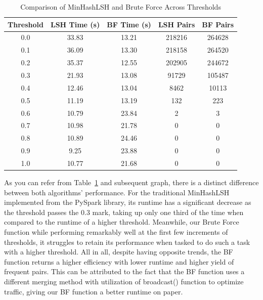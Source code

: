 \begin{table}[h]
    \centering
    \caption{Comparison of MinHashLSH and Brute Force Across Thresholds}
    \begin{tabular}{|c|c|c|c|c|}
        \hline
        \textbf{Threshold} & \textbf{LSH Time (s)} & \textbf{BF Time (s)} & \textbf{LSH Pairs} & \textbf{BF Pairs} \\
        \hline
        0.0 & 33.83 & 13.21 & 218216 & 264628 \\
        0.1 & 36.09 & 13.30 & 218158 & 264520 \\
        0.2 & 35.37 & 12.55 & 202905 & 244672 \\
        0.3 & 21.93 & 13.08 & 91729  & 105487 \\
        0.4 & 12.46 & 13.04 & 8462   & 10113  \\
        0.5 & 11.19 & 13.19 & 132    & 223    \\
        0.6 & 10.79 & 23.84 & 2      & 3      \\
        0.7 & 10.98 & 21.78 & 0      & 0      \\
        0.8 & 10.89 & 24.46 & 0      & 0      \\
        0.9 & 9.25  & 23.88 & 0      & 0      \\
        1.0 & 10.77 & 21.68 & 0      & 0      \\
        \hline
    \end{tabular}
    \label{tab:comparison}
\end{table}

As you can refer from Table~\ref{tab:comparison} and subsequent graph, there is a distinct difference between both algorithms' performance.
For the traditional MinHashLSH implemented from the PySpark library, its runtime has a significant decrease as the threshold passes the 0.3 mark, taking up only one third of the time when compared to the runtime of a higher threshold.
Meanwhile, our Brute Force function while performing remarkably well at the first few increments of thresholds, it struggles to retain its performance when tasked to do such a task with a higher threshold.
All in all, despite having opposite trends, the BF function returns a higher efficiency with lower runtime and higher yield of frequent pairs.
This can be attributed to the fact that the BF function uses a different merging method with utilization of broadcast() function to optimize traffic, giving our BF function a better runtime on paper.

